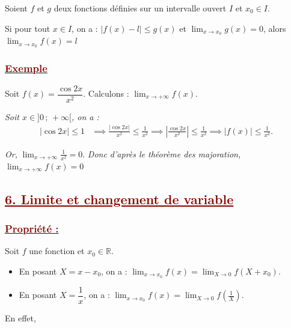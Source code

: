 \documentclass[12pt,a4paper]{article}
\begin{document}
Soient $f$ et $g$ deux fonctions définies sur un intervalle ouvert $I$ et $x_0 \in I$.

Si pour tout $x \in I$, on a : $|f(x) - l| \le g(x)$ et $\displaystyle \lim_{x \to x_0} g(x) = 0$, alors $\displaystyle \lim_{x \to x_0} f(x) = l$

\subsubsection*{\underline{\textcolor{darkred}{ Exemple }}}

Soit $f(x) = \dfrac{\cos 2x}{x^2}$. Calculons : $\displaystyle \lim_{x \to +\infty} f(x)$.
\vspace{0.2cm}

\textit{Soit $x \in ]0 \,;\, +\infty[$, on a :}
\begin{align*}
    |\cos 2x| \le 1 &\implies \frac{|\cos 2x|}{x^2} \le \frac{1}{x^2} \implies \left|\frac{\cos 2x}{x^2}\right| \le \frac{1}{x^2} \implies |f(x)| \le \frac{1}{x^2}.
\end{align*}

\vspace{0.1cm}

\textit{Or, } $\displaystyle \lim_{x \to +\infty} \frac{1}{x^2} = 0$. \textit{Donc d'après le théorème des majoration, } $\displaystyle \lim_{x \to +\infty} f(x) = 0$

\subsection*{\textcolor{darkred}{\underline{6. Limite et changement de variable}}}
\subsubsection*{\underline{\textcolor{darkred}{ Propriété : }}}

Soit $f$ une fonction et $x_0 \in \mathbb{R}$.

\begin{itemize}
    \item En posant $X = x - x_0$, on a :  $\displaystyle \lim_{x \to x_0} f(x) = \lim_{X \to 0} f(X + x_0)$.
    \item En posant $X = \dfrac{1}{x}$, on a :  $\displaystyle \lim_{x \to x_0} f(x) = \lim_{X \to 0} f\left(\frac{1}{X}\right)$.
\end{itemize}

En effet,
\end{document}

